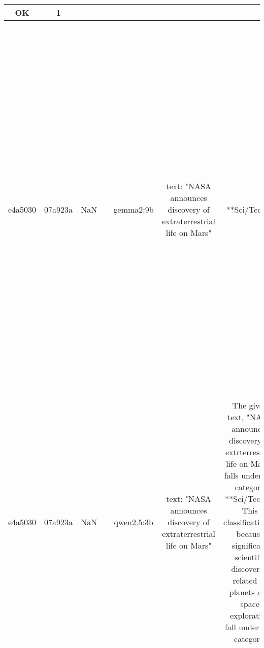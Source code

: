 \begin{table}[h!]
\begin{tabular}{|c|c|c|c|c|c|c|c|c|c|}
OK & 1\\
\hline
e4a5030 & 07a923a & NaN &  & gemma2:9b & text: "NASA announces discovery of extraterrestrial life on Mars" & **Sci/Tech** 
 & ok & The chatbot output provides a classification category of "Sci/Tech," which is mentioned in the description as one of the valid categories for classification. Based on the description, the categories available for classification include World, Sports, Business, and Sci/Tech. Since the output mentions "Sci/Tech," it complies with the prescribed categories in the description. 

No violation.
OK & 1\\
\hline
e4a5030 & 07a923a & NaN &  & qwen2.5:3b & text: "NASA announces discovery of extraterrestrial life on Mars" & The given text, "NASA announces discovery of extrterrestrial life on Mars," falls under the category **Sci/Tech**. This classification is because significant scientific discoveries related to planets and space exploration fall under this category. & ok & No violation.
OK & 1\\
\hline
e4a5030 & 07a923a & NaN &  & llama3.2:1b & text: "NASA announces discovery of extraterrestrial life on Mars" & Based on the input text, I would classify this article as:

**World**

The reason is that the topic of interest is extraterrestrial life, which falls under the category of World. & err & The chatbot output classifies the input text as "World", which is one of the specified categories in the description. However, the explanation given relates to "extraterrestrial life", which suggests a topic that may be more closely associated with the "Sci/Tech" category rather than "World" based on typical classifications. The categories provided include "World", "Sports", "Business", and "Sci/Tech", and there is no other specified category that extraterrestrial life clearly fits into apart from possibly Sci/Tech.

The output should strictly classify the input into one of these categories without potentially blending categories or using incorrect rationale. As such, the reasoning provided by the chatbot seems to suggest a misalignment with the category assignment, leading to confusion about its adherence to the specified categories.

ERR & 1\\
\hline
ffe5b82 & 07a923a & NaN &  & gpt-4o-mini & text: "Chancellor announces economic measures to tackle inflation" & Business & ok & No violation.
OK & 1\\
\hline
ffe5b82 & 07a923a & NaN &  & gemma2:9b & text: "Chancellor announces economic measures to tackle inflation" & The provided text falls under the **Business** category. 



\end{tabular}
\end{table}
